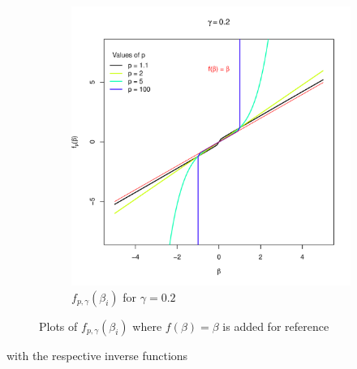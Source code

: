 \begin{figure}[H]
\begin{subfigure}{0.45\textwidth}
    \includegraphics[width=\linewidth]{Images/Figures_Exercise_1/penal_2.pdf} %
    \caption{$f_{p, \gamma}(\beta_i)$ for $\gamma = 0.2$}
    \label{fig:penal_2}
  \end{subfigure}
  \caption{Plots of $f_{p, \gamma}(\beta_i)$ where $f(\beta) = \beta$ is added for reference}
  \label{fig:penalized_lsq}
\end{figure}
with the respective inverse functions
